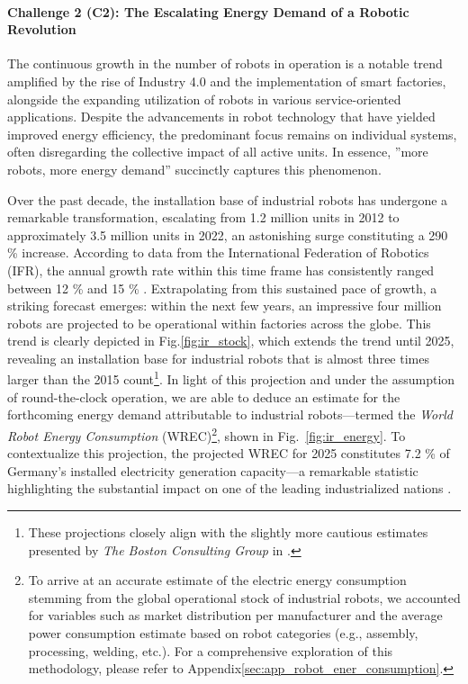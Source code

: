 \documentclass[12pt]{article}
\begin{document}
\paragraph*{\textbf{Challenge 2} (C2): The Escalating Energy Demand of a Robotic Revolution}\label{sec:robots_challenge}
The continuous growth in the number of robots in operation is a notable trend amplified by the rise of Industry 4.0 and the implementation of smart factories, alongside the expanding utilization of robots in various service-oriented applications. Despite the advancements in robot technology that have yielded improved energy efficiency, the predominant focus remains on individual systems, often disregarding the collective impact of all active units. In essence, ''more robots, more energy demand'' succinctly captures this phenomenon.

Over the past decade, the installation base of industrial robots has undergone a remarkable transformation, escalating from 1.2 million units in 2012 to approximately 3.5 million units in 2022, an astonishing surge constituting a 290 \% increase. According to data from the International Federation of Robotics (IFR), the annual growth rate within this time frame has consistently ranged between 12 \% and 15 \% \cite{IFR2019}. Extrapolating from this sustained pace of growth, a striking forecast emerges: within the next few years, an impressive four million robots are projected to be operational within factories across the globe. This trend is clearly depicted in Fig.\ref{fig:ir_stock}, which extends the trend until 2025, revealing an installation base for industrial robots that is almost three times larger than the 2015 count\footnote{These projections closely align with the slightly more cautious estimates presented by \textit{The Boston Consulting Group} in \cite{sirkin2015}.}. In light of this projection and under the assumption of round-the-clock operation, we are able to deduce an estimate for the forthcoming energy demand attributable to industrial robots---termed the \textit{World Robot Energy Consumption} (WREC)\footnote{To arrive at an accurate estimate of the electric energy consumption stemming from the global operational stock of industrial robots, we accounted for variables such as market distribution per manufacturer and the average power consumption estimate based on robot categories (e.g., assembly, processing, welding, etc.). For a comprehensive exploration of this methodology, please refer to Appendix\ref{sec:app_robot_ener_consumption}.}, shown in Fig.~\ref{fig:ir_energy}. To contextualize this projection, the projected WREC for 2025 constitutes 7.2 \% of Germany's installed electricity generation capacity—a remarkable statistic highlighting the substantial impact on one of the leading industrialized nations \cite{fraunhofer2016}.
\end{document}
